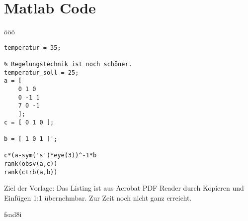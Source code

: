 \documentclass[draft]{max-masterarbeit} %
\begin{document}
\chapter{Matlab Code}

\todo{}
ööö
\lstset{language=Matlab}

\begin{lstlisting}[frame=single]
% Das Wetter ist schön.
temperatur = 35;

% Regelungstechnik ist noch schöner.
temperatur_soll = 25;
a = [
    0 1 0
    0 -1 1
    7 0 -1
    ];
c = [ 0 1 0 ];

b = [ 1 0 1 ]';

c*(a-sym('s')*eye(3))^-1*b
rank(obsv(a,c))
rank(ctrb(a,b))
\end{lstlisting}

Ziel der Vorlage: Das Listing ist aus Acrobat PDF Reader durch Kopieren und Einfügen 1:1 übernehmbar.
Zur Zeit noch nicht ganz erreicht.

\lstlistoflistings

fsad8i
\end{document}
